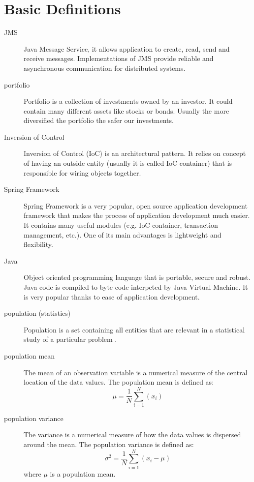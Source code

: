 \chapter{Basic Definitions}
\label{cha:basic}



\begin{description}
  \item [JMS]
	Java Message Service, it allows application to create, read, send and receive messages.
	Implementations of JMS provide reliable and asynchronous communication for distributed systems. 

  \item [portfolio]
	Portfolio is a collection of investments owned by an investor.
	It could contain many different assets like stocks or bonds.
	Usually the more diversified the portfolio the safer our investments.

  \item [Inversion of Control]
	Inversion of Control (IoC) is an architectural pattern.
	It relies on concept of having an outside entity (usually it is called IoC container) that is responsible for wiring objects together. \cite{Spring} 

  \item [Spring Framework] 
	Spring Framework is a very popular, open source application development framework that makes the process of   application development much easier.
	It contains many useful modules (e.g. IoC container, transaction management, etc.).
	One of its main advantages is lightweight and flexibility. \cite{Spring}

  \item [Java]
	Object oriented programming language that is portable, secure and robust.
	Java code is compiled to byte code interpeted by Java Virtual Machine. 
	It is very popular thanks to ease of application development. 

  \item [population (statistics)]
	Population is a set containing all entities that are relevant in a statistical study of a particular problem \cite{Oxford}. 

  \item [population mean]
	
	The mean of an observation variable is a numerical measure of the central location of the data values.
	The population mean is defined as:
	 \begin{equation}
			\mu = \frac{1}{N} \sum_{i=1}^{N}{(x_{i})} 
		      \end{equation}
  \item [population variance]
	The variance is a numerical measure of how the data values is dispersed around the mean.
	The population variance is defined as:  
	      \begin{equation}
			\sigma^2 = \frac{1}{N} \sum_{i=1}^{N}{(x_{i} - \mu)} 
		      \end{equation}
	where $\mu$ is a population mean.
	   

\end{description}
